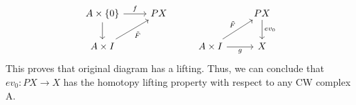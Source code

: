 \documentclass[letterpaper, 12pt]{article}
\begin{document}
\begin{solution}
\[\begin{tikzcd}
	{A\times \left\{0\right\}} & PX && PX \\
	{A\times I} && {A\times I} & X
	\arrow["f", from=1-1, to=1-2]
	\arrow[from=1-1, to=2-1]
	\arrow["{ev_0}", from=1-4, to=2-4]
	\arrow["{\tilde{F}}"', from=2-1, to=1-2]
	\arrow["{\tilde{F}}", from=2-3, to=1-4]
	\arrow["g"', from=2-3, to=2-4]
\end{tikzcd}\]
This proves that original diagram has a lifting. Thus, we can conclude that \(ev_0:PX\rightarrow X\) has the homotopy lifting property with respect to any CW complex A. 
\end{solution}
\end{document}
